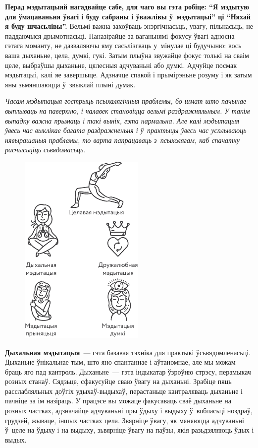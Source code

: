 \textbf{Перад мэдытацыяй нагадвайце сабе, для чаго вы гэта робіце: ``Я мэдытую для ўмацаваньня ўвагі і буду сабраны і ўважлівы ў~мэдытацыі'' ці ``Няхай я буду шчасьлівы''.} Вельмі важна захоўваць энэргічнасьць, увагу, пільнасьць, не паддаючыся дрымотнасьці. Паназірайце за ваганьнямі фокусу ўвагі адносна гэтага моманту, не дазваляючы яму сасьлізгваць у~мінулае ці будучыню: вось ваша дыханьне, цела, думкі, гукі. Затым плыўна звужайце фокус толькі на сваім целе, выбраўшы дыханьне, цялесныя адчуваньні або думкі. Адчуйце посмак мэдытацыі, калі яе завершыце. Адзначце спакой і прымірэньне розуму і як затым яны зьмяншаюцца ў~звыклай плыні думак.

\emph{Часам мэдытацыя гострыць псыхалягічныя праблемы, бо шмат што пачынае выплываць на паверхню, і чалавек становіцца вельмі раздражняльным. У такім выпадку важна прымаць і такі вынік, гэта нармальна. Але калі мэдытацыя ўвесь час выклікае багата раздражненьня і ў~практыцы ўвесь час усплываюць нявырашаныя праблемы, то варта папрацаваць з~псыхолягам, каб спачатку расчысьціць сьвядомасьць.}

\begin{figure}[htb!]
  \centering
  \includegraphics[scale=1.5]{willpower/ch8/12.pdf}
\end{figure}

\textbf{Дыхальная мэдытацыя}~--- гэта базавая тэхніка для практыкі ўсьвядомленасьці. Дыханьне ўнікальнае тым, што яно спантаннае і аўтаномнае, але мы можам браць яго пад кантроль. Дыханьне~--- гэта індыкатар ўзроўню стрэсу, перамыкач розных станаў. Сядзьце, сфакусуйце сваю ўвагу на дыханьні. Зрабіце пяць расслабляльных доўгіх удыхаў-выдыхаў, перастаньце кантраляваць дыханьне і пачніце за ім назіраць. У працэсе вы можаце факусаваць сваё дыханьне на розных частках, адзначайце адчуваньні пры ўдыху і выдыху ў~вобласьці ноздраў, грудзей, жываце, іншых частках цела. Звярніце ўвагу, як мяняюцца адчуваньні ў~целе на ўдыху і на выдыху, зьвярніце ўвагу на паўзы, якія разьдзяляюць ўдых і выдых.

